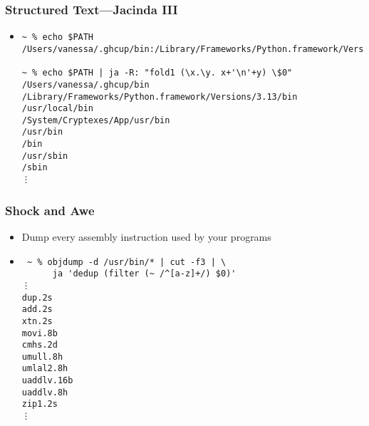 \documentclass{beamer}
\begin{document}
\begin{frame}[fragile]
  \frametitle{Structured Text---Jacinda III}
  \begin{itemize}
    \item
      \begin{verbatim}
~ % echo $PATH
/Users/vanessa/.ghcup/bin:/Library/Frameworks/Python.framework/Versions/3.13/bin:/Library/Frameworks/Python.framework/Versions/3.12/bin:/Library/Frameworks/Python.framework/Versions/3.11/bin:/Library/Frameworks/Python.framework/Versions/3.10/bin:/usr/local/bin:/System/Cryptexes/App/usr/bin:/usr/bin:/bin:/usr/sbin:/sbin:/var/run/com.apple.security.cryptexd/codex.system/bootstrap/usr/local/bin:/var/run/com.apple.security.cryptexd/codex.system/bootstrap/usr/bin:/var/run/com.apple.security.cryptexd/codex.system/bootstrap/usr/appleinternal/bin:/opt/X11/bin:/Library/TeX/texbin:/usr/local/go/bin:/Users/vanessa/.cpm/bin:/Users/vanessa/pakcs/bin:/Users/vanessa/.local/bin:/Users/vanessa/.cargo/bin:/Applications/iTerm.app/Contents/Resources/utilities:/Applications/CMake.app/Contents/bin:/Users/vanessa/.fzf/bin

~ % echo $PATH | ja -R: "fold1 (\x.\y. x+'\n'+y) \$0"
/Users/vanessa/.ghcup/bin
/Library/Frameworks/Python.framework/Versions/3.13/bin
/usr/local/bin
/System/Cryptexes/App/usr/bin
/usr/bin
/bin
/usr/sbin
/sbin
⋮
      \end{verbatim}
  \end{itemize}
\end{frame}


\begin{frame}[fragile]
  \frametitle{Shock and Awe}
  \begin{itemize}
    \item Dump every assembly instruction used by your programs
    \item
      \begin{verbatim}
 ~ % objdump -d /usr/bin/* | cut -f3 | \
      ja 'dedup (filter (~ /^[a-z]+/) $0)'
⋮
dup.2s
add.2s
xtn.2s
movi.8b
cmhs.2d
umull.8h
umlal2.8h
uaddlv.16b
uaddlv.8h
zip1.2s
⋮
      \end{verbatim}
  \end{itemize}
\end{frame}
\end{document}
